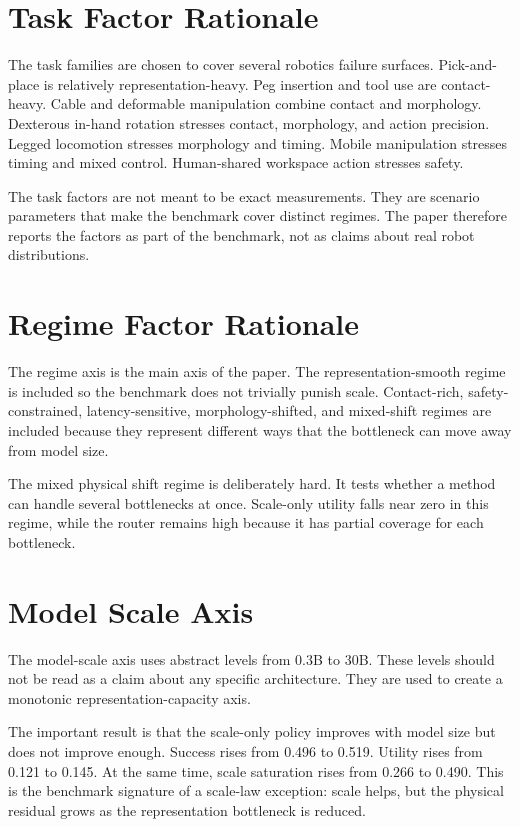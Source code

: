 \section{Task Factor Rationale}

The task families are chosen to cover several robotics failure surfaces. Pick-and-place is relatively representation-heavy. Peg insertion and tool use are contact-heavy. Cable and deformable manipulation combine contact and morphology. Dexterous in-hand rotation stresses contact, morphology, and action precision. Legged locomotion stresses morphology and timing. Mobile manipulation stresses timing and mixed control. Human-shared workspace action stresses safety.

The task factors are not meant to be exact measurements. They are scenario parameters that make the benchmark cover distinct regimes. The paper therefore reports the factors as part of the benchmark, not as claims about real robot distributions.

\section{Regime Factor Rationale}

The regime axis is the main axis of the paper. The representation-smooth regime is included so the benchmark does not trivially punish scale. Contact-rich, safety-constrained, latency-sensitive, morphology-shifted, and mixed-shift regimes are included because they represent different ways that the bottleneck can move away from model size.

The mixed physical shift regime is deliberately hard. It tests whether a method can handle several bottlenecks at once. Scale-only utility falls near zero in this regime, while the router remains high because it has partial coverage for each bottleneck.

\section{Model Scale Axis}

The model-scale axis uses abstract levels from 0.3B to 30B. These levels should not be read as a claim about any specific architecture. They are used to create a monotonic representation-capacity axis.

The important result is that the scale-only policy improves with model size but does not improve enough. Success rises from 0.496 to 0.519. Utility rises from 0.121 to 0.145. At the same time, scale saturation rises from 0.266 to 0.490. This is the benchmark signature of a scale-law exception: scale helps, but the physical residual grows as the representation bottleneck is reduced.

